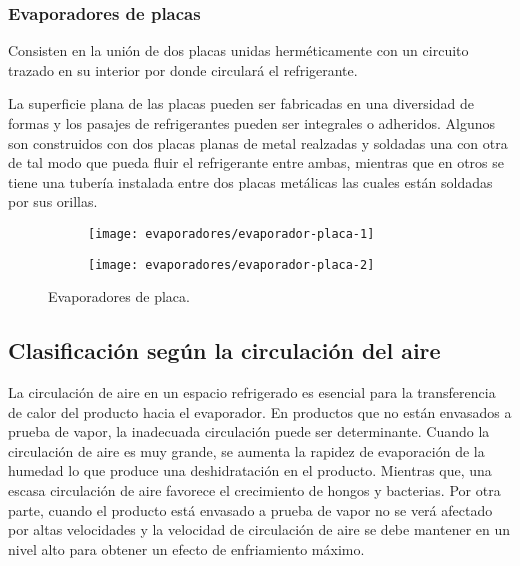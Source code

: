 			
			
		
		\subsubsection{Evaporadores de placas}
		
		
			Consisten en la unión de dos placas unidas herméticamente con un circuito trazado en su interior por donde circulará el refrigerante.
			
			La superficie plana de las placas pueden ser fabricadas en una diversidad de formas y los pasajes de refrigerantes pueden ser integrales o adheridos. Algunos son construidos con dos placas planas de metal realzadas y soldadas una con otra de tal modo que pueda fluir el refrigerante entre ambas, mientras que en otros se tiene una tubería instalada entre dos placas metálicas las cuales están soldadas por sus orillas.			
			
			\begin{figure}[h]
				\centering
				\begin{subfigure}{.4\linewidth}
				\texttt{[image: evaporadores/evaporador-placa-1]}
				\end{subfigure}
				\begin{subfigure}{.4\linewidth}
				\texttt{[image: evaporadores/evaporador-placa-2]}
				\end{subfigure}
				\caption{Evaporadores de placa.}
				\label{fig:evaporadores-placa}
			\end{figure}
	
	\subsection{Clasificación según la circulación del aire}	
	
	La circulación de aire en un espacio refrigerado es esencial para la transferencia de calor del producto hacia el evaporador. En productos que no están envasados a prueba de vapor, la inadecuada circulación puede ser determinante. Cuando la circulación de aire es muy grande, se aumenta la rapidez de evaporación de la humedad lo que produce una deshidratación en el producto. Mientras que, una escasa circulación de aire favorece el crecimiento de hongos y bacterias. Por otra parte, cuando el producto está envasado a prueba de vapor no se verá afectado por altas velocidades y la velocidad de circulación de aire se debe mantener en un nivel alto para obtener un efecto de enfriamiento máximo.
	
